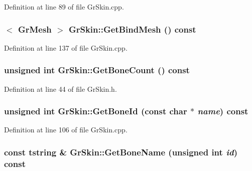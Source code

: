 Definition at line 89 of file GrSkin.cpp.\hypertarget{class_gr_skin_b914ebe591236b914e3f1bc6ebdb9cd4}{
\subsubsection[{GetBindMesh}]{$<$ {\bf GrMesh} $>$ GrSkin::GetBindMesh () const}}
\label{class_gr_skin_b914ebe591236b914e3f1bc6ebdb9cd4}




Definition at line 137 of file GrSkin.cpp.\hypertarget{class_gr_skin_d30c05bc779eff721c1b9b269e3d28b8}{
\subsubsection[{GetBoneCount}]{\setlength{\rightskip}{0pt plus 5cm}unsigned int GrSkin::GetBoneCount () const}}
\label{class_gr_skin_d30c05bc779eff721c1b9b269e3d28b8}




Definition at line 44 of file GrSkin.h.\hypertarget{class_gr_skin_f383388a947be2484c6d5417b8f41475}{
\subsubsection[{GetBoneId}]{\setlength{\rightskip}{0pt plus 5cm}unsigned int GrSkin::GetBoneId (const char $\ast$ {\em name}) const}}
\label{class_gr_skin_f383388a947be2484c6d5417b8f41475}




Definition at line 106 of file GrSkin.cpp.\hypertarget{class_gr_skin_b5ddb23b555eb380c4e40ad57fd89ee8}{
\subsubsection[{GetBoneName}]{\setlength{\rightskip}{0pt plus 5cm}const {\bf tstring} \& GrSkin::GetBoneName (unsigned int {\em id}) const}}
\label{class_gr_skin_b5ddb23b555eb380c4e40ad57fd89ee8}




